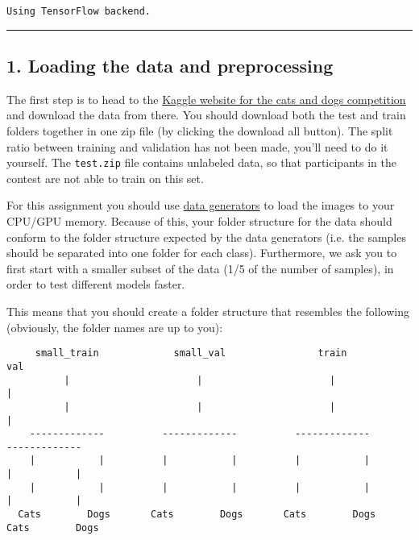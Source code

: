 \documentclass[11pt]{article}
\begin{document}
    \begin{Verbatim}[commandchars=\\\{\}]
Using TensorFlow backend.

    \end{Verbatim}

    \begin{center}\rule{0.5\linewidth}{\linethickness}\end{center}

\subsection{1. Loading the data and
preprocessing}\label{loading-the-data-and-preprocessing}

    The first step is to head to the
\href{https://www.kaggle.com/c/dogs-vs-cats}{Kaggle website for the cats
and dogs competition} and download the data from there. You should
download both the test and train folders together in one zip file (by
clicking the download all button). The split ratio between training and
validation has not been made, you'll need to do it yourself. The
\texttt{test.zip} file contains unlabeled data, so that participants in
the contest are not able to train on this set.

For this assignment you should use
\href{https://keras.io/preprocessing/image/}{data generators} to load
the images to your CPU/GPU memory. Because of this, your folder
structure for the data should conform to the folder structure expected
by the data generators (i.e. the samples should be separated into one
folder for each class). Furthermore, we ask you to first start with a
smaller subset of the data (1/5 of the number of samples), in order to
test different models faster.

This means that you should create a folder structure that resembles the
following (obviously, the folder names are up to you):

\begin{verbatim}
     small_train             small_val                train                   val
          |                      |                      |                      |
          |                      |                      |                      |
    -------------          -------------          -------------          -------------
    |           |          |           |          |           |          |           |
    |           |          |           |          |           |          |           |
  Cats        Dogs       Cats        Dogs       Cats        Dogs       Cats        Dogs
\end{verbatim}
\end{document}
